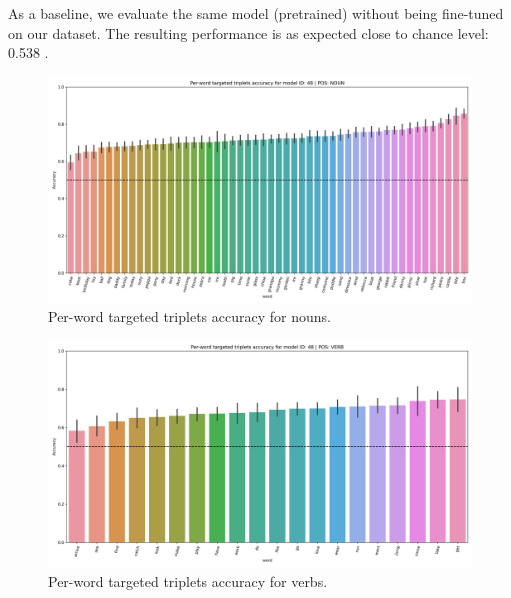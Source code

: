 As a baseline, we evaluate the same model (pretrained) without being fine-tuned on our dataset. The resulting performance is as expected close to chance level: 0.538 .


\begin{figure}
  \centering
  \includegraphics[width=\textwidth]{results/targeted_triplets/results_NOUN_word.png}
  \caption{Per-word targeted triplets accuracy for nouns.}
  \label{fig:accuracy_targeted_triplets_nouns}
\end{figure}

\begin{figure}
  \centering
  \includegraphics[width=\textwidth]{results/targeted_triplets/results_VERB_word.png}
  \caption{Per-word targeted triplets accuracy for verbs.}
  \label{fig:accuracy_targeted_triplets_verbs}
\end{figure}

 
